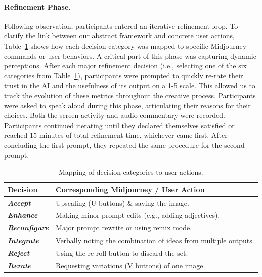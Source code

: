 \documentclass[letterpaper]{article} %
\begin{document}
\paragraph{Refinement Phase.} Following observation, participants entered an iterative refinement loop. To clarify the link between our abstract framework and concrete user actions, Table~\ref{tab:action-mapping} shows how each decision category was mapped to specific Midjourney commands or user behaviors. A critical part of this phase was capturing dynamic perceptions. After each major refinement decision (i.e., selecting one of the six categories from Table~\ref{tab:action-mapping}), participants were prompted to quickly re-rate their trust in the AI and the usefulness of its output on a 1-5 scale. This allowed us to track the evolution of these metrics throughout the creative process. Participants were asked to speak aloud during this phase, articulating their reasons for their choices. Both the screen activity and audio commentary were recorded. Participants continued iterating until they declared themselves satisfied or reached 15 minutes of total refinement time, whichever came first. After concluding the first prompt, they repeated the same procedure for the second prompt.


\begin{table}[htbp]
\centering
\caption{Mapping of decision categories to user actions.}
\label{tab:action-mapping}
\begin{tabular}{lp{6cm}}
\hline
\textbf{Decision} & \textbf{Corresponding Midjourney / User Action} \\
\hline
\textbf{\textit{Accept}} & Upscaling (U buttons) \& saving the image. \\
\textbf{\textit{Enhance}} & Making minor prompt edits (e.g., adding adjectives). \\
\textbf{\textit{Reconfigure}} & Major prompt rewrite or using remix mode. \\
\textbf{\textit{Integrate}} & Verbally noting the combination of ideas from multiple outputs. \\
\textbf{\textit{Reject}} & Using the re-roll button to discard the set. \\
\textbf{\textit{Iterate}} & Requesting variations (V buttons) of one image. \\
\hline
\end{tabular}
\end{table}
\end{document}

